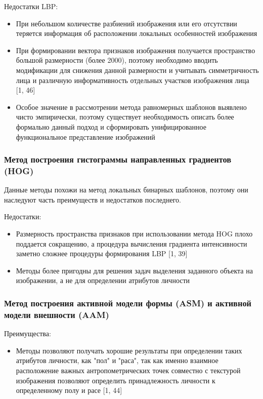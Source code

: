 \documentclass[main.tex]{subfiles}
\begin{document}
Недостатки LBP:
\begin{itemize}
    \item При небольшом количестве разбиений изображения или его отсутствии теряется информация об расположении локальных особенностей изображения
    \item При формировании вектора признаков изображения получается пространство большой размерности (более 2000), поэтому необходимо вводить модификации для снижения данной размерности и учитывать симметричность лица и различную информативность отдельных участков изображения лица [1, 46]
    \item Особое значение в рассмотрении метода равномерных шаблонов выявлено чисто эмпирически, поэтому существует необходимость описать более формально данный подход и сформировать унифицированное функциональное представление изображений
\end{itemize}

\subsubsection{Метод построения гистограммы направленных градиентов (HOG)}
Данные методы похожи на метод локальных бинарных шаблонов, поэтому они наследуют часть преимуществ и недостатков последнего.

Недостатки:
\begin{itemize}
    \item Размерность пространства признаков при использовании метода HOG плохо поддается сокращению, а процедура вычисления градиента интенсивности заметно сложнее процедуры формирования LBP [1, 39]
    \item Методы более пригодны для решения задач выделения заданного объекта на изображении, а не для определении атрибутов личности
\end{itemize}

\subsubsection{Метод построения активной модели формы (ASM) и активной модели внешности (AAM)}
Преимущества:
\begin{itemize}
    \item Методы позволяют получать хорошие результаты при определении таких атрибутов личности, как "пол" и "раса", так как именно взаимное расположение важных антропометрических точек совместно с текстурой изображения позволяют определить принадлежность личности к определенному полу и расе [1, 44]
\end{itemize}
\end{document}
